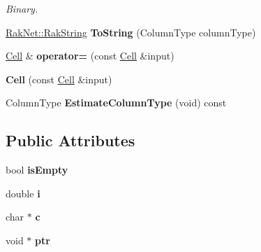 \begin{DoxyCompactItemize}
\begin{DoxyCompactList}\small\item\em Binary. \end{DoxyCompactList}\item 
\hypertarget{struct_data_structures_1_1_table_1_1_cell_a26afe7435ae506c0c62ee2ebcab1f373}{\hyperlink{class_rak_net_1_1_rak_string}{Rak\-Net\-::\-Rak\-String} {\bfseries To\-String} (Column\-Type column\-Type)}\label{struct_data_structures_1_1_table_1_1_cell_a26afe7435ae506c0c62ee2ebcab1f373}

\item 
\hypertarget{struct_data_structures_1_1_table_1_1_cell_a4bd41304264718221d0762572d7b64b9}{\hyperlink{struct_data_structures_1_1_table_1_1_cell}{Cell} \& {\bfseries operator=} (const \hyperlink{struct_data_structures_1_1_table_1_1_cell}{Cell} \&input)}\label{struct_data_structures_1_1_table_1_1_cell_a4bd41304264718221d0762572d7b64b9}

\item 
\hypertarget{struct_data_structures_1_1_table_1_1_cell_a28cf8d19603e1cb19c9f5d6689ab1e13}{{\bfseries Cell} (const \hyperlink{struct_data_structures_1_1_table_1_1_cell}{Cell} \&input)}\label{struct_data_structures_1_1_table_1_1_cell_a28cf8d19603e1cb19c9f5d6689ab1e13}

\item 
\hypertarget{struct_data_structures_1_1_table_1_1_cell_af5592d5ed33973866205d566e3aaaed2}{Column\-Type {\bfseries Estimate\-Column\-Type} (void) const }\label{struct_data_structures_1_1_table_1_1_cell_af5592d5ed33973866205d566e3aaaed2}

\end{DoxyCompactItemize}
\subsection*{Public Attributes}
\begin{DoxyCompactItemize}
\item 
\hypertarget{struct_data_structures_1_1_table_1_1_cell_a604bc863f25f833f352d4064ed003677}{bool {\bfseries is\-Empty}}\label{struct_data_structures_1_1_table_1_1_cell_a604bc863f25f833f352d4064ed003677}

\item 
\hypertarget{struct_data_structures_1_1_table_1_1_cell_a6e0e9d8de5d3ea687af23e5b0c357723}{double {\bfseries i}}\label{struct_data_structures_1_1_table_1_1_cell_a6e0e9d8de5d3ea687af23e5b0c357723}

\item 
\hypertarget{struct_data_structures_1_1_table_1_1_cell_ab732aa0d33409753f93aeccffb4dc08c}{char $\ast$ {\bfseries c}}\label{struct_data_structures_1_1_table_1_1_cell_ab732aa0d33409753f93aeccffb4dc08c}

\item 
\hypertarget{struct_data_structures_1_1_table_1_1_cell_aa9c09a4660110db5161be819515e19f0}{void $\ast$ {\bfseries ptr}}\label{struct_data_structures_1_1_table_1_1_cell_aa9c09a4660110db5161be819515e19f0}

\end{DoxyCompactItemize}



